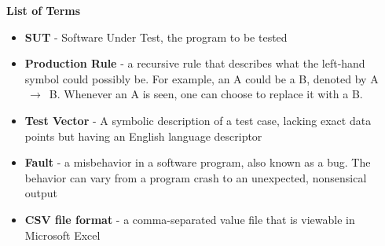 \thispagestyle{plain}
\newpage
\begin{center}


\textbf{List of Terms}

\vspace{.5cm}

\begin{itemize}
\item []\textbf{SUT} - Software Under Test, the program to be tested
\item []\textbf{Production Rule} - a recursive rule that describes what the left-hand symbol could possibly be. For example, an A could be a B, denoted by A $\,\to\,$ B. Whenever an A is seen, one can choose to replace it with a B.
\item []\textbf{Test Vector} - A symbolic description of a test case, lacking exact data points but having an English language descriptor
\item []\textbf{Fault} - a misbehavior in a software program, also known as a bug. The behavior can vary from a program crash to an unexpected, nonsensical output
\item []\textbf{CSV file format} - a comma-separated value file that is viewable in Microsoft Excel
\end{itemize}
\end{center}

\newpage